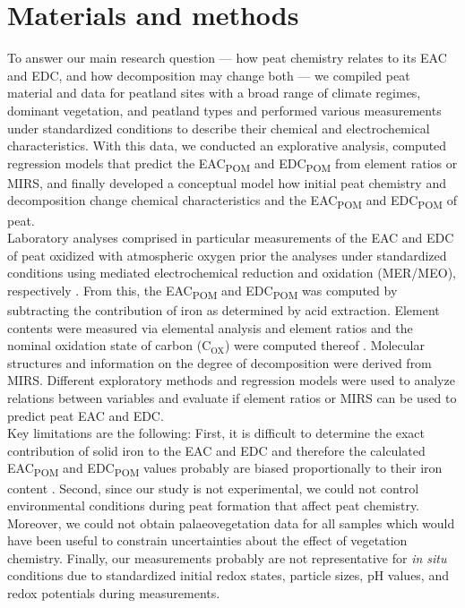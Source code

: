 \documentclass[alpha-refs, lineno]{wiley-article-rmd}
\begin{document}
\hypertarget{materials-and-methods}{%
\section{Materials and methods}\label{materials-and-methods}}

To answer our main research question --- how peat chemistry relates to its EAC and EDC, and how decomposition may change both --- we compiled peat material and data for peatland sites with a broad range of climate regimes, dominant vegetation, and peatland types and performed various measurements under standardized conditions to describe their chemical and electrochemical characteristics. With this data, we conducted an explorative analysis, computed regression models that predict the EAC\textsubscript{POM} and EDC\textsubscript{POM} from element ratios or MIRS, and finally developed a conceptual model how initial peat chemistry and decomposition change chemical characteristics and the EAC\textsubscript{POM} and EDC\textsubscript{POM} of peat.\\
Laboratory analyses comprised in particular measurements of the EAC and EDC of peat oxidized with atmospheric oxygen prior the analyses under standardized conditions using mediated electrochemical reduction and oxidation (MER/MEO), respectively \autocite{Aeschbacher.2010,Lau.2015}. From this, the EAC\textsubscript{POM} and EDC\textsubscript{POM} was computed by subtracting the contribution of iron as determined by acid extraction.
Element contents were measured via elemental analysis and element ratios and the nominal oxidation state of carbon (C\(_\text{OX}\)) were computed thereof \autocite{Masiello.2008,Worrall.2017}. Molecular structures and information on the degree of decomposition were derived from MIRS. Different exploratory methods and regression models were used to analyze relations between variables and evaluate if element ratios or MIRS can be used to predict peat EAC and EDC.\\
Key limitations are the following: First, it is difficult to determine the exact contribution of solid iron to the EAC and EDC and therefore the calculated EAC\textsubscript{POM} and EDC\textsubscript{POM} values probably are biased proportionally to their iron content \autocite{Lau.2015}.
Second, since our study is not experimental, we could not control environmental conditions during peat formation that affect peat chemistry. Moreover, we could not obtain palaeovegetation data for all samples which would have been useful to constrain uncertainties about the effect of vegetation chemistry. Finally, our measurements probably are not representative for \emph{in situ} conditions due to standardized initial redox states, particle sizes, pH values, and redox potentials during measurements.\\
\end{document}
